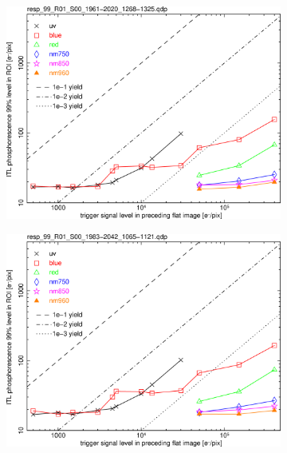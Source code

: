 \begin{figure}[!htbp]
\centering
\begin{subfigure}{0.45\textwidth}    
  \centering
  \includegraphics[width=\textwidth]{figures/phosphorescence-survey/phos_resp/resp_99_R01_S00_1961-2020_1268-1325.png}    
\end{subfigure}
\newline
\centering
\begin{subfigure}{0.45\textwidth}    
  \centering
  \includegraphics[width=\textwidth]{figures/phosphorescence-survey/phos_resp/resp_99_R01_S00_1983-2042_1065-1121.png}    
\end{subfigure}
\newline

\end{figure}

